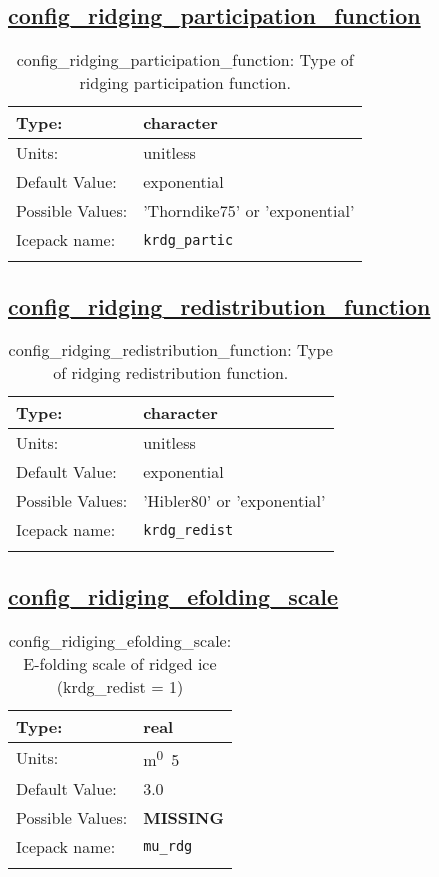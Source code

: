 \subsection[config\_ridging\_participation\_function]{\hyperref[sec:nm_tab_ridging]{config\_ridging\_participation\_function}}
\label{subsec:nm_sec_config_ridging_participation_function}
\begin{center}
\begin{longtable}{| p{2.0in} || p{4.0in} |}
    \hline
    Type: & character \\
    \hline
    Units: & \si{unitless} \\
    \hline
    Default Value: & exponential \\
    \hline
    Possible Values: & 'Thorndike75' or 'exponential' \\
    \hline
    \hline
    Icepack name: & \verb+krdg_partic+ \\
    \caption{config\_ridging\_participation\_function: Type of ridging participation function.}
\end{longtable}
\end{center}
\subsection[config\_ridging\_redistribution\_function]{\hyperref[sec:nm_tab_ridging]{config\_ridging\_redistribution\_function}}
\label{subsec:nm_sec_config_ridging_redistribution_function}
\begin{center}
\begin{longtable}{| p{2.0in} || p{4.0in} |}
    \hline
    Type: & character \\
    \hline
    Units: & \si{unitless} \\
    \hline
    Default Value: & exponential \\
    \hline
    Possible Values: & 'Hibler80' or 'exponential' \\
    \hline
    \hline
    Icepack name: & \verb+krdg_redist+ \\
    \caption{config\_ridging\_redistribution\_function: Type of ridging redistribution function.}
\end{longtable}
\end{center}
\subsection[config\_ridiging\_efolding\_scale]{\hyperref[sec:nm_tab_ridging]{config\_ridiging\_efolding\_scale}}
\label{subsec:nm_sec_config_ridiging_efolding_scale}
\begin{center}
\begin{longtable}{| p{2.0in} || p{4.0in} |}
    \hline
    Type: & real \\
    \hline
    Units: & \si{m^0.5} \\
    \hline
    Default Value: & 3.0 \\
    \hline
    Possible Values: & {\bf \color{red} MISSING} \\
    \hline
    \hline
    Icepack name: & \verb+mu_rdg+ \\
    \caption{config\_ridiging\_efolding\_scale: E-folding scale of ridged ice (krdg\_redist = 1)}
\end{longtable}
\end{center}
